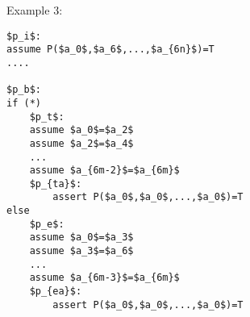 \newpage

\noindent
Example 3:
\begin{lstlisting}[caption=congruence closure eager interpolant arity,label=snippet3.29]
$p_i$:
assume P($a_0$,$a_6$,...,$a_{6n}$)=T
....

$p_b$:
if (*)
	$p_t$:
	assume $a_0$=$a_2$
	assume $a_2$=$a_4$
	...
	assume $a_{6m-2}$=$a_{6m}$
	$p_{ta}$:
		assert P($a_0$,$a_0$,...,$a_0$)=T
else
	$p_e$:
	assume $a_0$=$a_3$
	assume $a_3$=$a_6$
	...
	assume $a_{6m-3}$=$a_{6m}$
	$p_{ea}$:
		assert P($a_0$,$a_0$,...,$a_0$)=T
\end{lstlisting}

